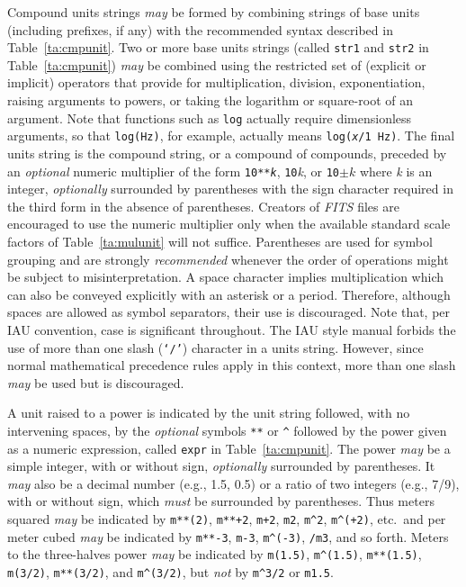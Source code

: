 \documentclass[onecolumn]{aa}
\begin{document}
Compound units strings {\em may} be formed by combining strings of base 
units (including prefixes, if any) with the recommended syntax 
described in Table~\ref{ta:cmpunit}. Two or more base units strings 
(called {\tt str1} and {\tt str2} in Table~\ref{ta:cmpunit}) {\em may} be combined using 
the restricted set of (explicit or implicit) operators that provide for 
multiplication, division, exponentiation, raising arguments to powers, 
or taking the logarithm or square-root of an argument. 
%
Note that functions such as {\tt log} actually require dimensionless 
arguments, so that {\tt log(Hz)}, for example, actually means 
{\tt log({\it x}/1~Hz)}.  The final units string is the compound string, or 
a compound of compounds, preceded by an {\em optional} numeric multiplier 
of the form {\tt 10**{\it k}}, {\tt 10}\^{\it k}, or {\tt 10}$\pm k$ where {\it k} is
an integer, {\em optionally} surrounded by parentheses with the sign
character required in the third form in the absence of parentheses. 
Creators of {\em FITS\/} files are encouraged to use the numeric multiplier 
only when the available standard scale factors of Table~\ref{ta:mulunit} 
will not suffice. 
Parentheses are used for symbol grouping and are strongly
{\em recommended} whenever the order of operations might be subject to
misinterpretation. A space character implies multiplication which can
also be conveyed explicitly with an asterisk or a period. 
%
Therefore, although spaces are allowed as symbol separators, 
their use is discouraged. 
Note that, per IAU convention, case is significant  throughout. 
The IAU style manual forbids the use of more than one slash 
({\tt `/'}) character in a units string. However, since normal mathematical 
precedence rules apply in this context, more than one slash 
{\em may} be used but is discouraged.  

A unit raised to a power is indicated by the unit string followed, with
no intervening spaces, by the {\em optional} symbols \verb+**+ or \verb+^+
followed by the power given as a numeric expression, called 
{\tt expr} in Table~\ref{ta:cmpunit}.  The power {\em may} be a simple
integer, with or without sign, {\em optionally} surrounded by parentheses.
It {\em may} also be a decimal number (e.g., 1.5, 0.5) or a ratio of two
integers (e.g., 7/9), with or without sign, which {\em must} be surrounded
by parentheses.  Thus meters squared {\em may} be indicated by \verb!m**(2)!,
\verb!m**+2!, \verb!m+2!, \verb!m2!, \verb!m^2!, \verb!m^(+2)!,
etc.~and per meter cubed {\em may} be indicated by \verb!m**-3!, 
\verb!m-3!, \verb!m^(-3)!, \verb!/m3!, and so forth. Meters to the 
three-halves power {\em may} be indicated by 
\verb!m(1.5)!, \verb!m^(1.5)!, \verb!m**(1.5)!,
\verb!m(3/2)!, \verb!m**(3/2)!, and \verb!m^(3/2)!, but {\it not} by
\verb!m^3/2! or \verb!m1.5!.
\end{document}
